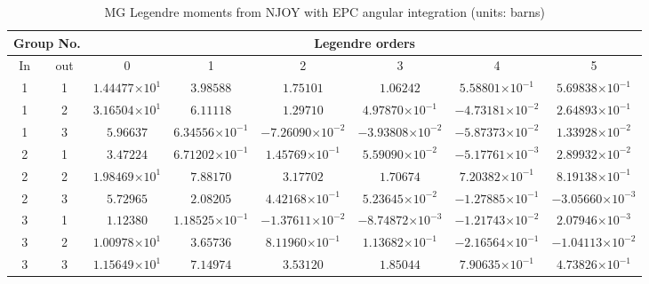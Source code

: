 \documentclass[review]{elsarticle}
\newcommand{\e}[1]{\ensuremath{\times10^{#1}}}
\begin{document}
\begin{table}[h]
\centering
\caption{MG Legendre moments from NJOY with EPC angular integration (units: barns)}\normalsize
\label{tb:njoy}
\scriptsize
\begin{adjustwidth}{-0.5cm}{}
\begin{tabular}{|c|c|c|c|c|c|c|c|}
\hline
\multicolumn{2}{|c|}{Group No.} & \multicolumn{6}{c|}{Legendre orders}\\
\hline
In & out & 0 & 1 & 2 & 3 & 4 & 5\\ 
\hline
1 & 1 & $1.44477\e{1}$ & $3.98588$ & $1.75101$ & $1.06242$ & $5.58801\e{-1}$ & $5.69838\e{-1}$\\
\hline
1 & 2 & $3.16504\e{1}$ & $6.11118$ & $1.29710$ & $4.97870\e{-1}$ & $-4.73181\e{-2}$ & $2.64893\e{-1}$\\
\hline
1 & 3 & $5.96637$ & $6.34556\e{-1}$ & $-7.26090\e{-2}$ & $-3.93808\e{-2}$ & $-5.87373\e{-2}$ & $1.33928\e{-2}$\\
\hline
2 & 1 & $3.47224$ & $6.71202\e{-1}$ & $1.45769\e{-1}$ & $5.59090\e{-2}$ & $-5.17761\e{-3}$ & $2.89932\e{-2}$\\
\hline
2 & 2 & $1.98469\e{1}$ & $7.88170$ & $3.17702$ & $1.70674$ & $7.20382\e{-1}$ & $8.19138\e{-1}$\\
\hline
2 & 3 & $5.72965$ & $2.08205$ & $4.42168\e{-1}$ & $5.23645\e{-2}$ & $-1.27885\e{-1}$ & $-3.05660\e{-3}$\\
\hline
3 & 1 & $1.12380$ & $1.18525\e{-1}$ & $-1.37611\e{-2}$ & $-8.74872\e{-3}$ & $-1.21743\e{-2}$ & $2.07946\e{-3}$\\
\hline
3 & 2 & $1.00978\e{1}$ & $3.65736$ & $8.11960\e{-1}$ & $1.13682\e{-1}$ & $-2.16564\e{-1}$ & $-1.04113\e{-2}$\\
\hline
3 & 3 & $1.15649\e{1}$ & $7.14974$ & $3.53120$ & $1.85044$ & $7.90635\e{-1}$ & $4.73826\e{-1}$\\
\hline
\end{tabular}
\end{adjustwidth}
\end{table}
\end{document}
